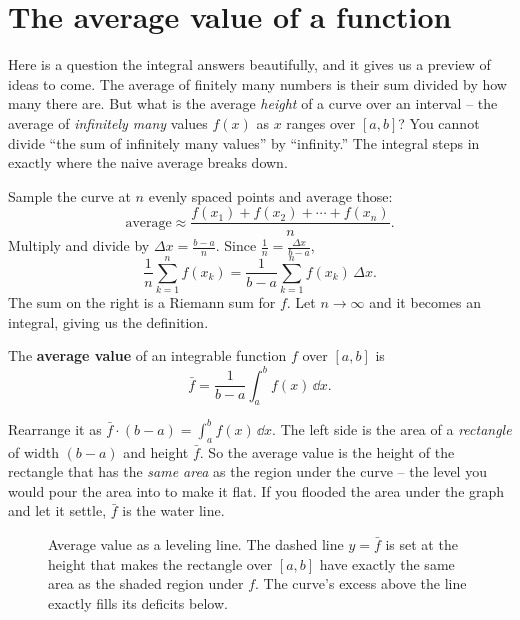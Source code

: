 \section{The average value of a function}
\label{ch20:average}

Here is a question the integral answers beautifully, and it gives us a preview of
ideas to come. The average of finitely many numbers is their sum divided by how
many there are. But what is the average \emph{height} of a curve over an interval
-- the average of \emph{infinitely many} values $f(x)$ as $x$ ranges over
$[a,b]$? You cannot divide ``the sum of infinitely many values'' by ``infinity.''
The integral steps in exactly where the naive average breaks down.

Sample the curve at $n$ evenly spaced points and average those:
\[
  \text{average} \approx \frac{f(x_1)+f(x_2)+\cdots+f(x_n)}{n}.
\]
Multiply and divide by $\Delta x = \tfrac{b-a}{n}$. Since $\tfrac1n =
\tfrac{\Delta x}{b-a}$,
\[
  \frac{1}{n}\sum_{k=1}^{n} f(x_k)
  = \frac{1}{b-a}\sum_{k=1}^{n} f(x_k)\,\Delta x.
\]
The sum on the right is a Riemann sum for $f$. Let $n \to \infty$ and it becomes
an integral, giving us the definition.

\begin{definition}
\label{ch20:def-average}
The \textbf{average value} of an integrable function $f$ over $[a,b]$ is
\[
  \bar f = \frac{1}{b-a}\int_a^b f(x)\,\dd x.
\]
\end{definition}

\begin{intuitionbox}
Rearrange it as $\bar f \cdot (b-a) = \int_a^b f(x)\,\dd x$. The left side is the
area of a \emph{rectangle} of width $(b-a)$ and height $\bar f$. So the average
value is the height of the rectangle that has the \emph{same area} as the region
under the curve -- the level you would pour the area into to make it flat. If you
flooded the area under the graph and let it settle, $\bar f$ is the water line.
\end{intuitionbox}

\begin{figure}[h]
\centering
{}
\caption{Average value as a leveling line. The dashed line $y=\bar f$ is set at
the height that makes the rectangle over $[a,b]$ have exactly the same area as
the shaded region under $f$. The curve's excess above the line exactly fills its
deficits below.}
\label{ch20:fig-average}
\end{figure}


